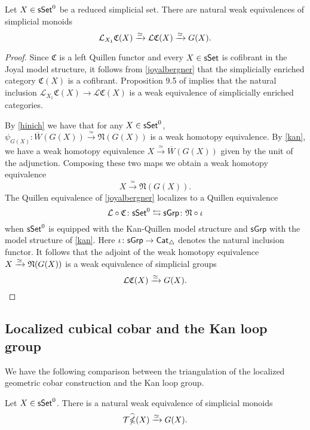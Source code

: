 \begin{proposition} \label{CandG}
	Let $X \in \mathsf{sSet}^0$ be a reduced simplicial set.
	There are natural weak equivalences of simplicial monoids
	$$\mathcal{L}_{X_1} \mathfrak{C}(X) \xrightarrow{\simeq} \mathcal{L}\mathfrak{C}(X) \xrightarrow{\simeq} G(X).$$
\end{proposition}

\begin{proof}
	Since $\mathfrak{C}$ is a left Quillen functor and every $X \in \mathsf{sSet}$ is cofibrant in the Joyal model structure, it follows from \cref{joyalbergner} that the simplicially enriched category $\mathfrak{C}(X)$ is a cofibrant.
	Proposition 9.5 of \cite{dwyer1980simplicial} implies that the natural inclusion $\mathcal{L}_{X_1} \mathfrak{C}(X) \to \mathcal{L}\mathfrak{C}(X)$ is a weak equivalence of simplicially enriched categories.
	
	By \cref{hinich} we have that for any $X \in \mathsf{sSet}^0$, $\psi_{G(X)} \colon \overline{W}(G(X)) \xrightarrow{\simeq} \mathfrak{N}(G(X))$ is a weak homotopy equivalence.
	By \cref{kan}, we have a weak homotopy equivalence $X \xrightarrow{\simeq} \overline{W}(G(X))$ given by the unit of the adjunction.
	Composing these two maps we obtain a weak homotopy equivalence
	$$X \xrightarrow{\simeq} \mathfrak{N}(G(X)).$$ 
	The Quillen equivalence of \cref{joyalbergner} localizes to a Quillen equivalence
	$$\mathcal{L} \circ \mathfrak{C} \colon \mathsf{sSet}^0 \leftrightarrows \mathsf{sGrp} \colon \mathfrak{N} \circ \iota$$
	when $\mathsf{sSet}^0$ is equipped with the Kan-Quillen model structure and $\mathsf{sGrp}$ with the model structure of \cref{kan}.
	Here $\iota \colon \mathsf{sGrp} \to \mathsf{Cat}_{\triangle}$ denotes the natural inclusion functor.
	It follows that the adjoint of the weak homotopy equivalence $X \xrightarrow{\simeq} \mathfrak{N}(G(X))$ is a weak equivalence of simplicial groups
	$$\mathcal{L}\mathfrak{C}(X) \xrightarrow{\simeq} G(X).$$ 
\end{proof}

\subsection{Localized cubical cobar and the Kan loop group}

We have the following comparison between the triangulation of the localized geometric cobar construction and the Kan loop group.

\begin{corollary} \label{widehatgcobarandG}
	Let $X \in \mathsf{sSet}^0$.
	There is a natural weak equivalence of simplicial monoids
	$$\mathcal{T} \widehat{\operatorname{\mathbb{\Omega}}}(X) \xrightarrow{\simeq}G(X).$$
\end{corollary}

